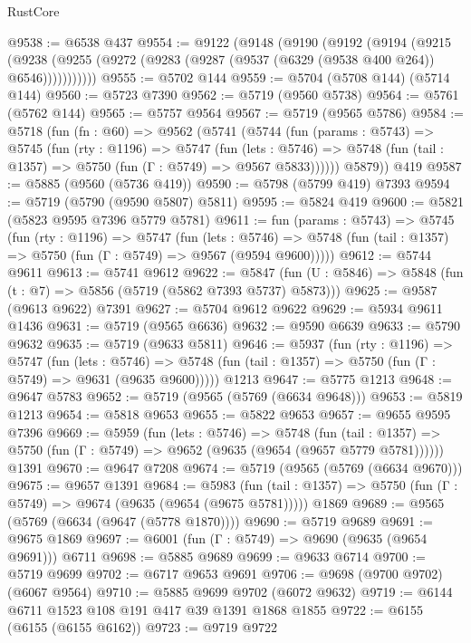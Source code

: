 \begin{lexlean}{RustCore}
\begin{coremodule}
{\begin{coremodule}
{{{{{{{{{{{{{{{{{{{{{{{{{{{{{{{{{{{{{{{{{{{{@9538 := @6538 @437
@9554 := @9122
    (@9148
      (@9190
        (@9192
          (@9194
            (@9215
              (@9238 (@9255 (@9272 (@9283 (@9287 (@9537 (@6329 (@9538 @400 @264)) @6546)))))))))))
@9555 := @5702 @144
@9559 := @5704 (@5708 @144) (@5714 @144)
@9560 := @5723 @7390
@9562 := @5719 (@9560 @5738)
@9564 := @5761 (@5762 @144)
@9565 := @5757 @9564
@9567 := @5719 (@9565 @5786)
@9584 := @5718
    (fun (fn : @60) =>
    @9562
      (@5741
        (@5744
          (fun (params : @5743) =>
          @5745
            (fun (rty : @1196) =>
            @5747
              (fun (lets : @5746) =>
              @5748 (fun (tail : @1357) => @5750 (fun (Γ : @5749) => @9567 @5833))))))
        @5879))
    @419
@9587 := @5885 (@9560 (@5736 @419))
@9590 := @5798 (@5799 @419) @7393
@9594 := @5719 (@5790 (@9590 @5807) @5811)
@9595 := @5824 @419
@9600 := @5821 (@5823 @9595 @7396 @5779 @5781)
@9611 := fun (params : @5743) =>
  @5745
    (fun (rty : @1196) =>
    @5747
      (fun (lets : @5746) =>
      @5748 (fun (tail : @1357) => @5750 (fun (Γ : @5749) => @9567 (@9594 @9600)))))
@9612 := @5744 @9611
@9613 := @5741 @9612
@9622 := @5847 (fun (U : @5846) => @5848 (fun (t : @7) => @5856 (@5719 (@5862 @7393 @5737) @5873)))
@9625 := @9587 (@9613 @9622) @7391
@9627 := @5704 @9612 @9622
@9629 := @5934 @9611 @1436
@9631 := @5719 (@9565 @6636)
@9632 := @9590 @6639
@9633 := @5790 @9632
@9635 := @5719 (@9633 @5811)
@9646 := @5937
    (fun (rty : @1196) =>
    @5747
      (fun (lets : @5746) =>
      @5748 (fun (tail : @1357) => @5750 (fun (Γ : @5749) => @9631 (@9635 @9600)))))
    @1213
@9647 := @5775 @1213
@9648 := @9647 @5783
@9652 := @5719 (@9565 (@5769 (@6634 @9648)))
@9653 := @5819 @1213
@9654 := @5818 @9653
@9655 := @5822 @9653
@9657 := @9655 @9595 @7396
@9669 := @5959
    (fun (lets : @5746) =>
    @5748
      (fun (tail : @1357) => @5750 (fun (Γ : @5749) => @9652 (@9635 (@9654 (@9657 @5779 @5781))))))
    @1391
@9670 := @9647 @7208
@9674 := @5719 (@9565 (@5769 (@6634 @9670)))
@9675 := @9657 @1391
@9684 := @5983
    (fun (tail : @1357) => @5750 (fun (Γ : @5749) => @9674 (@9635 (@9654 (@9675 @5781)))))
    @1869
@9689 := @9565 (@5769 (@6634 (@9647 (@5778 @1870))))
@9690 := @5719 @9689
@9691 := @9675 @1869
@9697 := @6001 (fun (Γ : @5749) => @9690 (@9635 (@9654 @9691))) @6711
@9698 := @5885 @9689
@9699 := @9633 @6714
@9700 := @5719 @9699
@9702 := @6717 @9653 @9691
@9706 := @9698 (@9700 @9702) (@6067 @9564)
@9710 := @5885 @9699 @9702 (@6072 @9632)
@9719 := @6144 @6711 @1523 @108 @191 @417 @39 @1391 @1868 @1855
@9722 := @6155 (@6155 (@6155 @6162))
@9723 := @9719 @9722
}}}}}}}}}}}}}}}}}}}}}}}}}}}}}}}}}}}}}}}}}}}}
\end{coremodule}}
\end{coremodule}
\end{lexlean}
